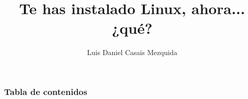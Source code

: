 \documentclass[aspectratio=43]{beamer}
\title{Te has instalado Linux, ahora... ¿qué?} %
\author{Luis Daniel Casais Mezquida} %
\institute{\edicion Jornadas Técnicas del GUL} %
\date{\fecha} %
\begin{document}
{
    \begin{frame}
        \titlepage
    \end{frame}
}
\addtocounter{framenumber}{-1}



\begin{frame}
    \frametitle{Tabla de contenidos} %
    \tableofcontents %
\end{frame}



\begin{frame}
    \frametitle{}

\end{frame}
\end{document}
